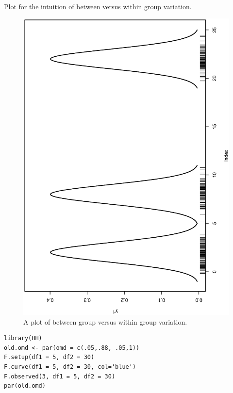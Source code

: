\documentclass[captions=tableheading]{scrbook}
\begin{document}
Plot for the intuition of between versus within group variation.






\begin{figure}[th]
    \includegraphics[angle=270, totalheight=4in]{img/Between-versus-within.ps}
    \caption[Between group versus within group variation]{A plot of between group versus within group variation.}
    \label{fig:Between-versus-within}
  \end{figure}



\begin{verbatim}
library(HH)
old.omd <- par(omd = c(.05,.88, .05,1))
F.setup(df1 = 5, df2 = 30)
F.curve(df1 = 5, df2 = 30, col='blue')
F.observed(3, df1 = 5, df2 = 30)
par(old.omd)
\end{verbatim}
\end{document}
